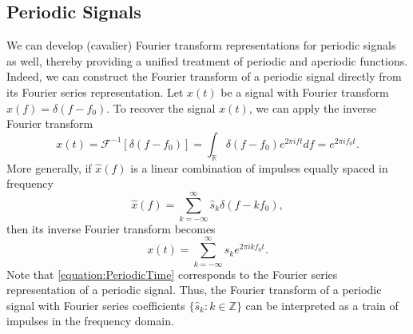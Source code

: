 \subsection{Periodic Signals}
\label{section:PeriodicSignals}

We can develop (cavalier) Fourier transform representations for periodic signals as well, thereby providing a unified treatment of periodic and aperiodic functions. 
Indeed, we can construct the Fourier transform of a periodic signal directly from its Fourier series representation.
Let $x(t)$ be a signal with Fourier transform $\hat{x}(f) = \delta (f - f_0)$.
To recover the signal $x(t)$, we can apply the inverse Fourier transform
\begin{equation*}
x(t) = \mathcal{F}^{-1} [ \delta (f - f_0) ]
=\int_{\mathbb{R}} \delta (f - f_0) e^{2 \pi i f t} df
= e^{2 \pi i f_0 t}.
\end{equation*}
More generally, if $\hat{x}(f)$ is a linear combination of impulses equally spaced in frequency
\begin{equation} \label{equation:PeriodicFrequency}
\hat{x}(f) = \sum_{k = -\infty}^{\infty} \hat{s}_k \delta (f - k f_0) ,
\end{equation}
then its inverse Fourier transform becomes
\begin{equation} \label{equation:PeriodicTime}
x(t) = \sum_{k = -\infty}^{\infty} \hat{s}_k e^{2 \pi i k f_0 t} .
\end{equation}
Note that \eqref{equation:PeriodicTime} corresponds to the Fourier series representation of a periodic signal.
Thus, the Fourier transform of a periodic signal with Fourier series coefficients $\{ \hat{s}_k : k \in \mathbb{Z} \}$ can be interpreted as a train of impulses in the frequency domain.

